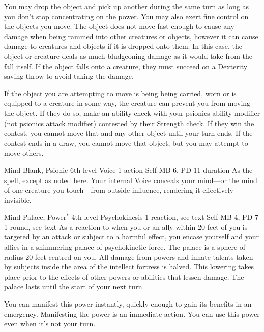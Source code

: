   You may drop the object and pick up another during
  the same turn as long as you don't stop concentrating
  on the power.
  You may also exert fine control on the objects you move.
  The object does not move fast enough to cause any damage
  when being rammed into other creatures or objects,
  however it can cause damage to creatures and objects
  if it is dropped onto them.
  In this case, the object or creature deals as much
  bludgeoning damage as it would take from the fall itself.
  If the object falls onto a creature,
  they must succeed on a Dexterity saving throw
  to avoid taking the damage.

  If the object you are attempting to move is being being carried, worn
  or is equipped to a creature in some way,
  the creature can prevent you from moving the object.
  If they do so, make an ability check with your
  psionics ability modifier (not psionics attack modifier)
  contested by their Strength check.
  If they win the contest, you cannot move that and
  any other object until your turn ends.
  If the contest ends in a draw, you cannot move
  that object, but you may attempt to move others.
  
\DndPowerHeader%
  {Mind Blank, Psionic}
  {6th-level Voice}
  {1 action}
  {Self}
  {MB 6, PD 11}
  {duration}
As the  spell, except as noted here.
Your internal Voice conceals your mind---or
the mind of one creature you touch---from
outside influence,
rendering it effectively invisible. 

\DndPowerHeader%
  {Mind Palace, Power$^*$}
  {4th-level Psychokinesis}
  {1 reaction, see text}
  {Self}
  {MB 4, PD 7}
  {1 round, see text}
  As a reaction to when you or an ally within 20 feet of you
  is targeted by an attack or subject to a harmful effect,
  you encase yourself and your allies in a
  shimmering palace of psychokinetic force.
  The palace is a sphere of radius 20 feet centred on you. 
  All damage from powers and innate talents
  taken by subjects inside the area of the intellect fortress
  is halved.
  This lowering takes place prior to the effects
  of other powers or abilities that lessen damage.
  The palace lasts until the start of your next turn.
  
  You can manifest this power instantly,
  quickly enough to gain its benefits in an emergency.
  Manifesting the power is an immediate action.
  You can use this power even when it's not your turn.

